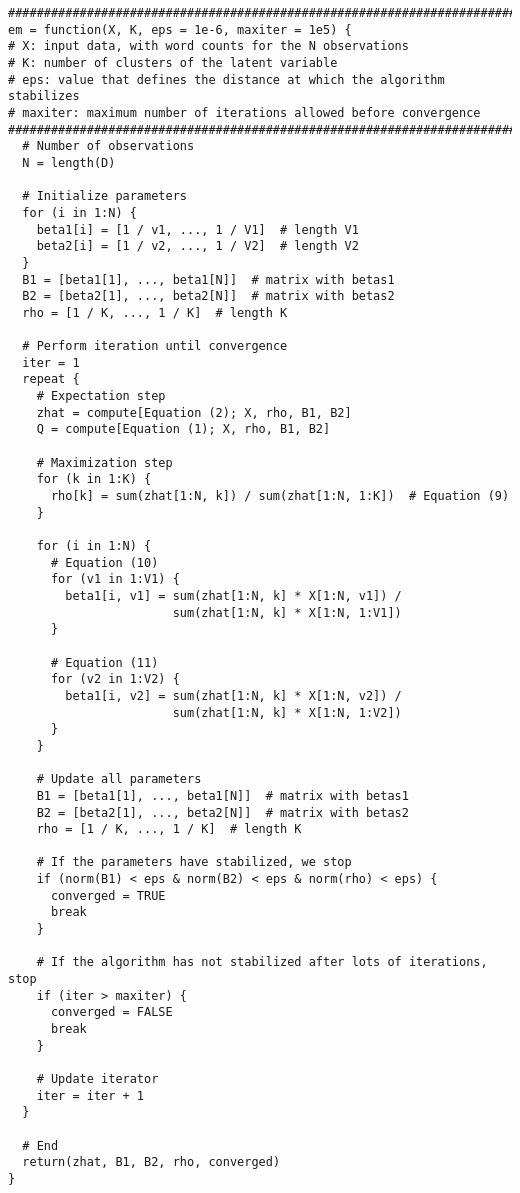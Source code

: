 \documentclass[a4paper, 11pt]{article}
\begin{document}
\begin{verbatim}
################################################################################
em = function(X, K, eps = 1e-6, maxiter = 1e5) {
# X: input data, with word counts for the N observations
# K: number of clusters of the latent variable
# eps: value that defines the distance at which the algorithm stabilizes
# maxiter: maximum number of iterations allowed before convergence
################################################################################  
  # Number of observations
  N = length(D)

  # Initialize parameters
  for (i in 1:N) {
    beta1[i] = [1 / v1, ..., 1 / V1]  # length V1
    beta2[i] = [1 / v2, ..., 1 / V2]  # length V2
  }
  B1 = [beta1[1], ..., beta1[N]]  # matrix with betas1
  B2 = [beta2[1], ..., beta2[N]]  # matrix with betas2
  rho = [1 / K, ..., 1 / K]  # length K

  # Perform iteration until convergence
  iter = 1
  repeat {
    # Expectation step
    zhat = compute[Equation (2); X, rho, B1, B2]
    Q = compute[Equation (1); X, rho, B1, B2]

    # Maximization step
    for (k in 1:K) {
      rho[k] = sum(zhat[1:N, k]) / sum(zhat[1:N, 1:K])  # Equation (9)
    }

    for (i in 1:N) {
      # Equation (10)
      for (v1 in 1:V1) {
        beta1[i, v1] = sum(zhat[1:N, k] * X[1:N, v1]) /
                       sum(zhat[1:N, k] * X[1:N, 1:V1])
      }

      # Equation (11)
      for (v2 in 1:V2) {
        beta1[i, v2] = sum(zhat[1:N, k] * X[1:N, v2]) /
                       sum(zhat[1:N, k] * X[1:N, 1:V2])
      }
    }

    # Update all parameters
    B1 = [beta1[1], ..., beta1[N]]  # matrix with betas1
    B2 = [beta2[1], ..., beta2[N]]  # matrix with betas2
    rho = [1 / K, ..., 1 / K]  # length K

    # If the parameters have stabilized, we stop
    if (norm(B1) < eps & norm(B2) < eps & norm(rho) < eps) {
      converged = TRUE
      break
    }

    # If the algorithm has not stabilized after lots of iterations, stop
    if (iter > maxiter) {
      converged = FALSE
      break
    }

    # Update iterator
    iter = iter + 1
  }

  # End
  return(zhat, B1, B2, rho, converged)
}
\end{verbatim}
\end{document}
